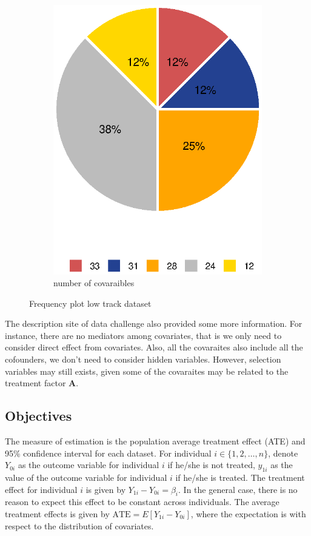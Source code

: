 \documentclass[11pt, oneside]{article}
\newcommand{\bA}{\mathbf{A}}
\begin{document}
\begin{figure}[]
\begin{subfigure}{.5\textwidth}
  \includegraphics[width=1\linewidth]{../plot/var_freq}
  \caption{number of covaraibles}
\end{subfigure}
\caption{Frequency plot low track dataset}
\label{fig:pie}
\end{figure}
The description site of data challenge also provided some more information. For instance, there are no mediators among covariates, that is we only need to consider direct effect from covariates. Also, all the covaraites also include all the cofounders, we don't need to consider hidden variables. However, selection variables may still exists, given some of the covaraites may be related to the treatment factor $\bA$.
\subsection{Objectives}
The measure of estimation is the population average treatment effect (ATE) and 95\% confidence interval for each dataset. For individual $i \in \{1,2,\ldots,n\}$, denote $Y_{0i}$ as the outcome variable for individual $i$ if he/she is not treated, $y_{1i}$ as the value of the outcome variable for individual $i$ if he/she is treated. The treatment effect for individual $i$ is given by $Y_{1i}-Y_{0i}=\beta_i$. In the general case, there is no reason to expect this effect to be constant across individuals. The average treatment effects is given by $\mbox{ATE}=E[Y_{1i}-Y_{0i}]$, where the expectation is with respect to the distribution of covariates. 
\end{document}
